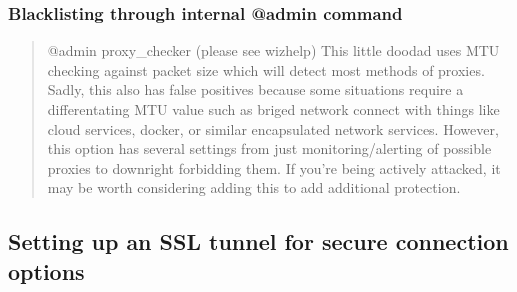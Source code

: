 \documentclass[letterpaper,10pt,english]{sphinxmanual}
\begin{document}
\subsubsection{Blacklisting through internal @admin command}
\label{\detokenize{security:blacklisting-through-internal-admin-command}}\begin{quote}

\sphinxAtStartPar
@admin proxy\_checker (please see wizhelp)
This little doodad uses MTU checking against packet size which will
detect most methods of proxies.  Sadly, this also has false positives
because some situations require a differentating MTU value such as
briged network connect with things like cloud services, docker, or
similar encapsulated network services.  However, this option has
several settings from just monitoring/alerting of possible proxies
to downright forbidding them.  If you’re being actively attacked,
it may be worth considering adding this to add additional protection.
\end{quote}


\subsection{Setting up an SSL tunnel for secure connection options}
\label{\detokenize{security:setting-up-an-ssl-tunnel-for-secure-connection-options}}
\end{document}
